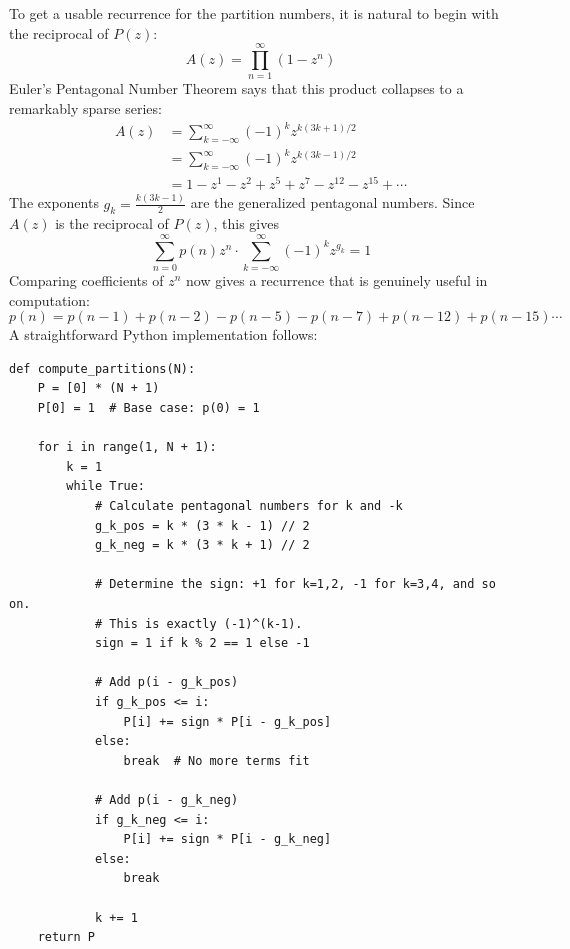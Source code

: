 
To get a usable recurrence for the partition numbers, it is natural to begin with the reciprocal of $P(z)$:
\begin{equation*}
    A(z) = \prod_{n = 1}^{\infty}(1 - z^{n})
\end{equation*}
Euler's Pentagonal Number Theorem says that this product collapses to a remarkably sparse series:
\begin{equation*}
    \begin{aligned}
        A(z)
            &= \sum_{k = -\infty}^{\infty}(-1)^{k}z^{k(3k + 1)/2} \\
            &= \sum_{k = -\infty}^{\infty}(-1)^{k}z^{k(3k - 1)/2} \\
            &= 1 - z^{1} - z^{2} + z^{5} + z^{7} - z^{12} - z^{15} + \cdots
    \end{aligned}
\end{equation*}
The exponents $g_{k} = \frac{k(3k - 1)}{2}$ are the generalized pentagonal numbers. Since $A(z)$ is the reciprocal of $P(z)$, this gives
\begin{equation*}
    \sum_{n = 0}^{\infty} p(n)z^{n} \cdot \sum_{k = -\infty}^{\infty}(-1)^{k}z^{g_{k}} = 1
\end{equation*}
Comparing coefficients of $z^{n}$ now gives a recurrence that is genuinely useful in computation:
\begin{equation*}
    p(n) = p(n - 1) + p(n - 2) - p(n - 5) - p(n - 7) + p(n - 12) + p(n - 15) \cdots
\end{equation*}
A straightforward Python implementation follows:
\newpage
\begin{lstlisting}
def compute_partitions(N):
    P = [0] * (N + 1)
    P[0] = 1  # Base case: p(0) = 1

    for i in range(1, N + 1):
        k = 1
        while True:
            # Calculate pentagonal numbers for k and -k
            g_k_pos = k * (3 * k - 1) // 2
            g_k_neg = k * (3 * k + 1) // 2

            # Determine the sign: +1 for k=1,2, -1 for k=3,4, and so on.
            # This is exactly (-1)^(k-1).
            sign = 1 if k % 2 == 1 else -1

            # Add p(i - g_k_pos)
            if g_k_pos <= i:
                P[i] += sign * P[i - g_k_pos]
            else:
                break  # No more terms fit

            # Add p(i - g_k_neg)
            if g_k_neg <= i:
                P[i] += sign * P[i - g_k_neg]
            else:
                break

            k += 1
    return P
\end{lstlisting}

